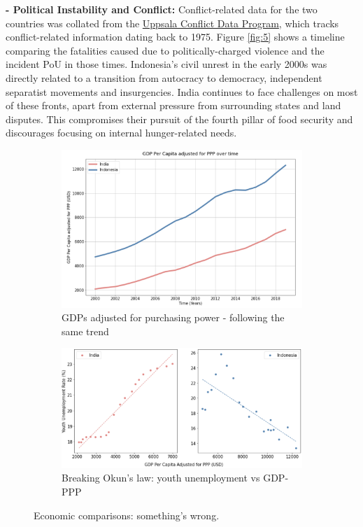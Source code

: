 \documentclass{article}
\begin{document}
\textbf{- Political Instability and Conflict:} Conflict-related data for the two countries was collated from the \href{https://ucdp.uu.se/encyclopedia}{Uppsala Conflict Data Program}, which tracks conflict-related information dating back to 1975. Figure \ref{fig:5} shows a timeline comparing the fatalities caused due to politically-charged violence and the incident PoU in those times. Indonesia's civil unrest in the early 2000s was directly related to a transition from autocracy to democracy, independent separatist movements and insurgencies. India continues to face challenges on most of these fronts, apart from external pressure from surrounding states and land disputes. This compromises their pursuit of the fourth pillar of food security and discourages focusing on internal hunger-related needs.

\begin{figure}

\begin{subfigure}{0.4\textwidth}
\includegraphics[width=\textwidth]{gdp_ppp} 
\caption{GDPs adjusted for purchasing power - following the same trend}
\label{fig:6a}
\end{subfigure}
\begin{subfigure}{0.6\textwidth}
\includegraphics[width=\textwidth]{unemployment}
\caption{Breaking Okun's law: youth unemployment vs GDP-PPP}
\label{fig:6b}
\end{subfigure}

\caption{Economic comparisons: something's wrong.}
\label{fig:6}
\end{figure}
\end{document}
